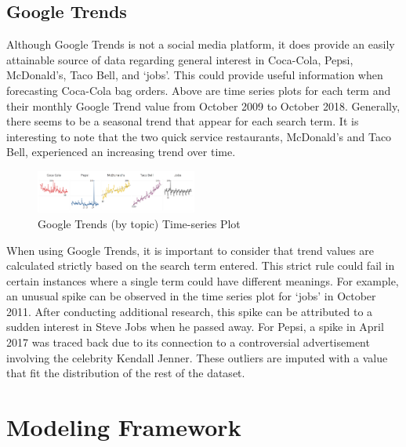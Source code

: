 \documentclass[12pt,oneside]{chicagocapstone}
\begin{document}
\hypertarget{google-trends}{%
\subsection*{Google Trends}\label{google-trends}}

Although Google Trends is not a social media platform, it does provide an easily attainable source of data regarding general interest in Coca-Cola, Pepsi, McDonald's, Taco Bell, and `jobs'. This could provide useful information when forecasting Coca-Cola bag orders.
Above are time series plots for each term and their monthly Google Trend value from October 2009 to October 2018. Generally, there seems to be a seasonal trend that appear for each search term. It is interesting to note that the two quick service restaurants, McDonald's and Taco Bell, experienced an increasing trend over time.
\begin{figure}

{\centering \includegraphics[width=200px,angle = 0, scale=2.1]{figure/GoogleTrends} 

}

\caption{Google Trends (by topic) Time-series Plot}\label{fig:GoogleTrends}
\end{figure}
When using Google Trends, it is important to consider that trend values are calculated strictly based on the search term entered. This strict rule could fail in certain instances where a single term could have different meanings. For example, an unusual spike can be observed in the time series plot for `jobs' in October 2011. After conducting additional research, this spike can be attributed to a sudden interest in Steve Jobs when he passed away. For Pepsi, a spike in April 2017 was traced back due to its connection to a controversial advertisement involving the celebrity Kendall Jenner. These outliers are imputed with a value that fit the distribution of the rest of the dataset.

\newpage

\hypertarget{modeling-framework}{%
\section*{Modeling Framework}\label{modeling-framework}}
\end{document}
